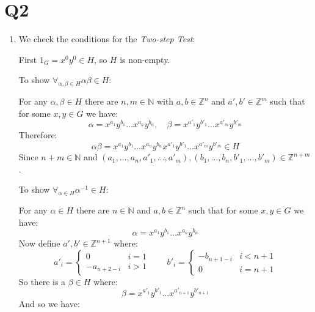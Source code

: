 \documentclass[a4paper, 11pt]{article}
\newcommand{\NN}{\mathbb{N}}
\newcommand{\ZZ}{\mathbb{Z}}
\begin{document}
\section*{Q2}
\begin{enumerate}[label=(\alph*)]
	\item 
	We check the conditions for the \textit{Two-step Test}:

	First $1_G=x^0y^0\in H$, so $H$ is non-empty.

	To show $\forall_{\alpha,\beta\in H}\alpha\beta\in H$:
	\begin{mdframed}
		For any $\alpha,\beta\in H$ there are $n,m\in\NN$ with $a,b\in\ZZ^n$ and $a',b'\in\ZZ^m$ such that for some $x,y\in G$ we have: 
		\[
			\alpha = x^{a_1}y^{b_1}\dots x^{a_n}y^{b_n},\quad
			\beta  = x^{a'_1}y^{b'_1}\dots x^{a'_m}y^{b'_m}	
		\]
		Therefore: 
		\[
			\alpha\beta = x^{a_1}y^{b_1}\dots x^{a_n}y^{b_n}x^{a'_1}y^{b'_1}\dots x^{a'_m}y^{b'_m}\in H	
		\]
		Since $n+m\in\NN$ and $(a_1,\dots,a_n,a'_1,\dots,a'_m),(b_1,\dots,b_n,b'_1,\dots,b'_m)\in\ZZ^{n+m}$.
	\end{mdframed}

	To show $\forall_{\alpha\in H}\alpha^{-1}\in H$:
	\begin{mdframed}
		For any $\alpha\in H$ there are $n\in\NN$ and $a,b\in\ZZ^n$ such that for some $x,y\in G$ we have: 
		\[
			\alpha = x^{a_1}y^{b_1}\dots x^{a_n}y^{b_n}
		\]
		Now define $a',b'\in\ZZ^{n+1}$ where: 
		\[
			a'_i = \begin{cases}
				0          & i=1  \\ 
				-a_{n+2-i} & i > 1
			\end{cases}
			\qquad b'_i = \begin{cases}
				-b_{n+1-i} & i < n + 1 \\
				0          & i = n + 1   
			\end{cases}
		\]
		So there is a $\beta\in H$ where: 
		\[
			\beta = x^{a'_1}y^{b'_1}\dots x^{a'_{n+1}}y^{b'_{n+1}}	
		\]
		And so we have:



\end{mdframed}
\end{enumerate}
\end{document}
